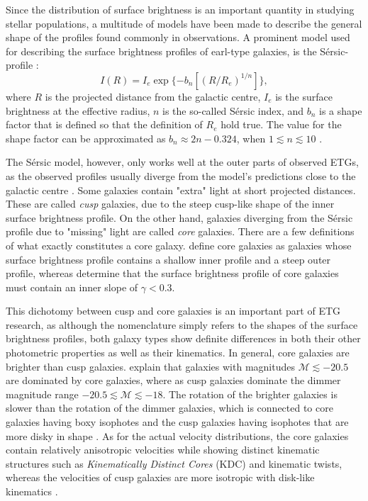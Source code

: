 \documentclass[english, oneside]{HYgradu}
\begin{document}
Since the distribution of surface brightness is an important quantity in studying stellar populations, a multitude of models have been made to describe the general shape of the profiles found commonly in observations. A prominent model used for describing the surface brightness profiles of earl-type galaxies, is the Sérsic-profile \citep{Sersic1968}:
\begin{equation}
I (R) = I_e \exp \{ -b_n \left[ (R / R_e)^{1/n} \right] \},
\end{equation}
where $R$ is the projected distance from the galactic centre, $I_e$ is the surface brightness at the effective radius, $n$ is the so-called Sérsic index, and $b_n$ is a shape factor that is defined so that the definition of $R_e$ hold true. The value for the shape factor can be approximated as $b_n \approx 2n - 0.324$, when $1 \lesssim n \lesssim 10$ \citep{BinneyTremaine}.

The Sérsic model, however, only works well at the outer parts of observed ETGs, as the observed profiles usually diverge from the model's predictions close to the galactic centre \citep{Kormendy2009}. Some galaxies contain "extra" light at short projected distances. These are called \textit{cusp} galaxies, due to the steep cusp-like shape of the inner surface brightness profile. On the other hand, galaxies diverging from the Sérsic profile due to "missing" light are called \textit{core} galaxies. There are a few definitions of what exactly constitutes a core galaxy. \cite{Kormendy1999} define core galaxies as galaxies whose surface brightness profile contains a shallow inner profile and a steep outer profile, whereas \cite{Lauer1995} determine that the surface brightness profile of core galaxies must contain an inner slope of $\gamma < 0.3$. 

This dichotomy between cusp and core galaxies is an important part of ETG research, as although the nomenclature simply refers to the shapes of the surface brightness profiles, both galaxy types show definite differences in both their other photometric properties as well as their kinematics. In general, core galaxies are brighter than cusp galaxies. \cite{GalaxyFormationAndEvo2010} explain that galaxies with magnitudes $\mathcal{M} \lesssim -20.5$ are dominated by core galaxies, where as cusp galaxies dominate the dimmer magnitude range $-20.5 \lesssim \mathcal{M} \lesssim -18$. The rotation of the brighter galaxies is slower than the rotation of the dimmer galaxies, which is connected to core galaxies having boxy isophotes and the cusp galaxies having isophotes that are more disky in shape \citep{Faber1997}. As for the actual velocity distributions, the core galaxies contain relatively anisotropic velocities while showing distinct kinematic structures such as \textit{Kinematically Distinct Cores} (KDC) and kinematic twists, whereas the velocities of cusp galaxies are more isotropic with disk-like kinematics \citep{Kormendy2009, Krajnovic2008}.
\end{document}
